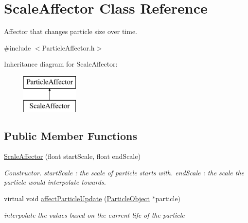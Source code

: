 \hypertarget{class_scale_affector}{}\section{Scale\+Affector Class Reference}
\label{class_scale_affector}


Affector that changes particle size over time.  




{\ttfamily \#include $<$Particle\+Affector.\+h$>$}

Inheritance diagram for Scale\+Affector\+:\begin{figure}[H]
\begin{center}
\leavevmode
\includegraphics[height=2.000000cm]{class_scale_affector}
\end{center}
\end{figure}
\subsection*{Public Member Functions}
\begin{DoxyCompactItemize}
\item 
\mbox{\label{class_scale_affector_a28d6f4d64b67735347eae8c8d05da2e2}} 
\mbox{\hyperlink{class_scale_affector_a28d6f4d64b67735347eae8c8d05da2e2}{Scale\+Affector}} (float start\+Scale, float end\+Scale)
\begin{DoxyCompactList}\small\item\em Constructor. start\+Scale \+: the scale of particle starts with. end\+Scale \+: the scale the particle would interpolate towards. \end{DoxyCompactList}\item 
\mbox{\label{class_scale_affector_aed5224f20a6c4c1474d202df5a192544}} 
virtual void \mbox{\hyperlink{class_scale_affector_aed5224f20a6c4c1474d202df5a192544}{affect\+Particle\+Update}} (\mbox{\hyperlink{class_particle_object}{Particle\+Object}} $\ast$particle)
\begin{DoxyCompactList}\small\item\em interpolate the values based on the current life of the particle \end{DoxyCompactList}\end{DoxyCompactItemize}


